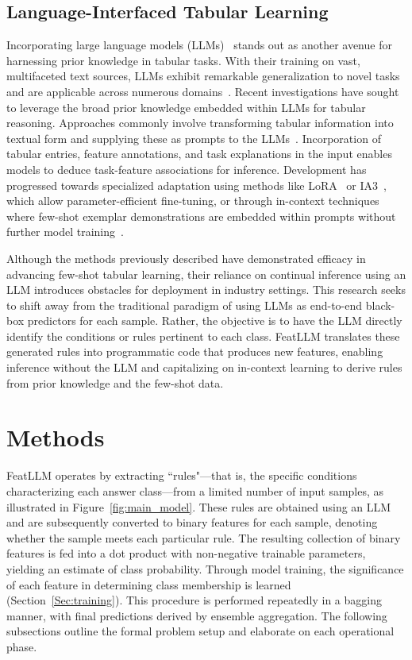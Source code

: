 \subsection{Language-Interfaced Tabular Learning} Incorporating large language models (LLMs)~\cite{anil2023palm,openai2023gpt4} stands out as another avenue for harnessing prior knowledge in tabular tasks. With their training on vast, multifaceted text sources, LLMs exhibit remarkable generalization to novel tasks and are applicable across numerous domains~\cite{brown2020language}. Recent investigations have sought to leverage the broad prior knowledge embedded within LLMs for tabular reasoning. Approaches commonly involve transforming tabular information into textual form and supplying these as prompts to the LLMs~\cite{dinh2022lift,hegselmann2023tabllm,wang2023anypredict}. Incorporation of tabular entries, feature annotations, and task explanations in the input enables models to deduce task-feature associations for inference. Development has progressed towards specialized adaptation using methods like LoRA~\cite{hu2021lora} or IA3~\cite{liu2022few}, which allow parameter-efficient fine-tuning, or through in-context techniques where few-shot exemplar demonstrations are embedded within prompts without further model training~\cite{dinh2022lift,hegselmann2023tabllm,nam2023semi,slack2023tablet}.

Although the methods previously described have demonstrated efficacy in advancing few-shot tabular learning, their reliance on continual inference using an LLM introduces obstacles for deployment in industry settings. This research seeks to shift away from the traditional paradigm of using LLMs as end-to-end black-box predictors for each sample. Rather, the objective is to have the LLM directly identify the conditions or rules pertinent to each class. \textsf{FeatLLM} translates these generated rules into programmatic code that produces new features, enabling inference without the LLM and capitalizing on in-context learning to derive rules from prior knowledge and the few-shot data.

\section{Methods}
\textsf{FeatLLM} operates by extracting ``rules"—that is, the specific conditions characterizing each answer class—from a limited number of input samples, as illustrated in Figure~\ref{fig:main_model}. These rules are obtained using an LLM and are subsequently converted to binary features for each sample, denoting whether the sample meets each particular rule. The resulting collection of binary features is fed into a dot product with non-negative trainable parameters, yielding an estimate of class probability. Through model training, the significance of each feature in determining class membership is learned (Section~\ref{Sec:training}). This procedure is performed repeatedly in a bagging manner, with final predictions derived by ensemble aggregation. The following subsections outline the formal problem setup and elaborate on each operational phase.

